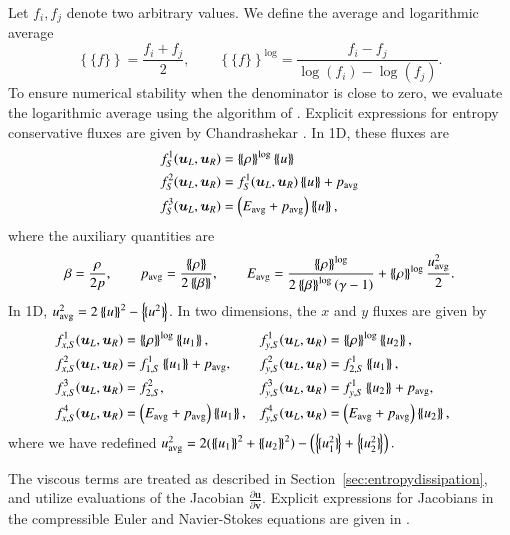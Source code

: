\documentclass[preprint,10pt]{elsarticle}
\theoremstyle{definition}
\theoremstyle{lemma}
\theoremstyle{theorem}
\theoremstyle{assumption}
\newcommand{\pd}[2]{\frac{\partial#1}{\partial#2}}
\newcommand{\LRp}[1]{\left( #1 \right)}
\newcommand{\LRc}[1]{\left\{ #1 \right\}}
\newcommand{\avg}[1] {\ensuremath{\LRc{\!\{#1\}\!}}}
\newcommand{\note}[1]{{\color{blue}{#1}}}
\begin{document}
{Let $f_i, f_j$ denote two arbitrary values.  We define the average and logarithmic average}
\[
{\avg{f} = \frac{f_i + f_j}{2}}, \qquad {\avg{f}^{\log} = \frac{f_i - f_j}{\log\LRp{f_i}-\log\LRp{f_j}}}.
\]
To ensure numerical stability when the denominator is close to zero, we evaluate the logarithmic average using the algorithm of \cite{ismail2009affordable}.  
Explicit expressions for entropy conservative fluxes are given by Chandrashekar \cite{chandrashekar2013kinetic}.  In 1D, these fluxes are
\begin{align*}
f^1_S(\bm{u}_L,\bm{u}_R) &= \avg{\rho}^{\log} \avg{u}\\
f^2_S(\bm{u}_L,\bm{u}_R) &= f^1_S(\bm{u}_L,\bm{u}_R)\avg{u} + p_{\rm avg}\\
f^3_S(\bm{u}_L,\bm{u}_R) &= \LRp{E_{\rm avg} + p_{\rm avg}}\avg{u},
\end{align*}
where the auxiliary quantities are
\begin{gather*}
{\beta = \frac{\rho}{2p}}, \qquad p_{\rm avg} = \frac{\avg{\rho}}{2\avg{\beta}}, \qquad E_{\rm avg} = \frac{\avg{\rho}^{\log}}{2\avg{\beta}^{\log}\LRp{\gamma -1}}   + \avg{\rho}^{\log}\frac{{u_{\rm avg}^2}}{2}.
\end{gather*}
In 1D, $u_{\rm avg}^2 = 2\avg{u}^2-\avg{u^2}$.  
In two dimensions, the $x$ and $y$ fluxes are given by
\begin{align*}
&f^1_{x,S}(\bm{u}_L,\bm{u}_R) = \avg{\rho}^{\log} \avg{u_1},& &f^1_{y,S}(\bm{u}_L,\bm{u}_R) = \avg{\rho}^{\log} \avg{u_2},&\\
&f^2_{x,S}(\bm{u}_L,\bm{u}_R) = f^1_{1,S} \avg{u_1} + p_{\rm avg},&  &f^2_{y,S}(\bm{u}_L,\bm{u}_R) = f^1_{2,S} \avg{u_1},&\nonumber\\
&f^3_{x,S}(\bm{u}_L,\bm{u}_R) = f^2_{2,S},& &f^3_{y,S}(\bm{u}_L,\bm{u}_R) = f^1_{y,S} \avg{u_2} + p_{\rm avg},&\nonumber\\
&f^4_{x,S}(\bm{u}_L,\bm{u}_R) = \LRp{E_{\rm avg} + p_{\rm avg}}\avg{u_1},& &f^4_{y,S}(\bm{u}_L,\bm{u}_R) = \LRp{E_{\rm avg} + p_{\rm avg} }\avg{u_2},& \nonumber
\end{align*}
where we have redefined ${u^2_{\rm avg}} = 2(\avg{u_1}^2 + \avg{u_2}^2) - \LRp{\avg{u_1^2} +\avg{u_2^2}}.$

The viscous terms are treated as described in Section~\ref{sec:entropydissipation}, and utilize evaluations of the Jacobian $\pd{\bm{u}}{\bm{v}}$.  Explicit expressions for Jacobians in the compressible Euler and Navier-Stokes equations are given in \cite{hughes1986new}.  
\end{document}

